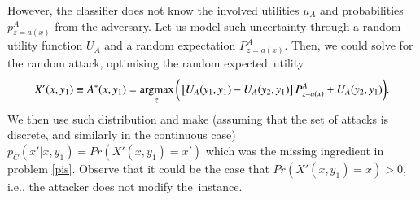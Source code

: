 However, the classifier does not know the involved utilities $u_A$ and probabilities $ p_{z=a(x)} ^A $ from the adversary.
Let us model such uncertainty through a random utility function $U _A$ and a random expectation $ P_{z=a(x)}^A $. Then, we could solve for the random attack, optimising the random expected~utility
%
\begin{eqnarray*}
 X'(x,y_1) \equiv A^*(x, y_1) = \operatorname*{argmax}_{z} \bigg(  \left[ U_A( y_1, y_1) - U_A( y_2, y_1) \right] P_{z=a(x)}^A   +    U_A( y_2, y_1) \bigg).
\end{eqnarray*}
%
We then use such distribution and make ({assuming that the set of attacks is discrete,
and similarly in the continuous case}) %
$p_C(x'|x,y_1) =Pr(X'(x,y_1) = x')$ which was the missing
ingredient in 
problem \eqref{pis}. Observe that it could be the case that $Pr(X'(x,y_1)=x)>0$,
i.e., the attacker does not modify the~instance.

%

